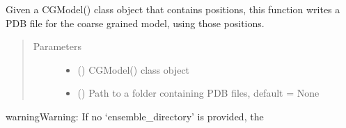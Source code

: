 \documentclass[letterpaper,12pt,english,openany,oneside]{sphinxmanual}
\begin{document}

\begin{fulllineitems}
\label{\detokenize{ensembles:ensembles.ens_build.write_ensemble_pdb}}
Given a CGModel() class object that contains positions, this function writes a PDB file for the coarse grained model, using those positions.
\begin{quote}\begin{description}
\item[{Parameters}] \leavevmode\begin{itemize}
\item {} 
 () \textendash{} CGModel() class object

\item {} 
 () \textendash{} Path to a folder containing PDB files, default = None

\end{itemize}

\end{description}\end{quote}

\begin{sphinxadmonition}{warning}{Warning:}
If no ‘ensemble\_directory’ is provided, the
\end{sphinxadmonition}

\end{fulllineitems}

\end{document}
